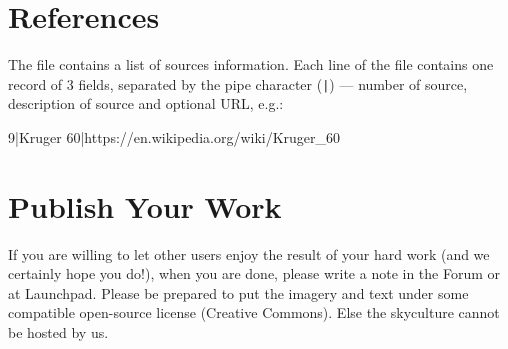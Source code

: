\section{References}
\label{sec:skycultures:references}

 The file  contains a list of sources information. 
Each line of the file contains one record of 3 fields,
separated by the pipe character (\texttt{|}) --- number of source, 
description of source and optional URL, e.g.:

\begin{configfile}
9|Kruger 60|https://en.wikipedia.org/wiki/Kruger_60
\end{configfile}

\section{Publish Your Work}
\label{sec:skyculture:publish}

If you are willing to let other users enjoy the result of your hard work (and we
certainly hope you do!), when you are done, please write a note in the
Forum or at Launchpad.  Please be prepared to put the imagery and text
under some compatible open-source license (Creative Commons). Else the
skyculture cannot be hosted by us.



